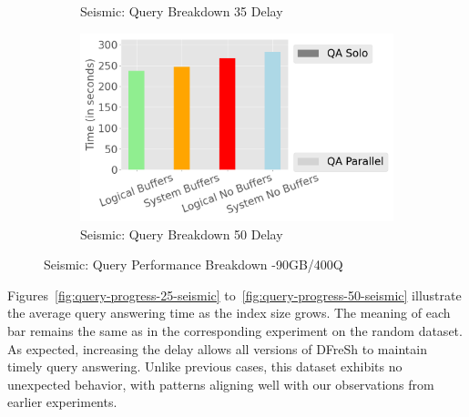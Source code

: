 \begin{figure}
\begin{subfigure}[c]{0.48\textwidth}
		\caption{Seismic: Query Breakdown 35 Delay}
		\label{fig:actual-query-breakdown-35-seismic}
	\end{subfigure}
	\begin{subfigure}[c]{0.48\textwidth}
		\includegraphics[width=1\textwidth]	 {figures/Experiments/Dynamic/SEISMIC/50/breakdown_seismic_50.png}
		\caption{Seismic: Query Breakdown 50 Delay}
		\label{fig:actual-query-breakdown-50-seismic}
	\end{subfigure}
	\caption{Seismic: Query Performance Breakdown -90GB/400Q}
	\label{fig:dfresh-query-breakdown-seismic}
\end{figure}

%
Figures~\ref{fig:query-progress-25-seismic} to~\ref{fig:query-progress-50-seismic} 
illustrate the average query answering time as the index size grows. The meaning of
each bar remains the same as in the corresponding experiment on the random dataset.
As expected, increasing the delay allows all versions of DFreSh to maintain timely
query answering. Unlike previous cases, this dataset exhibits no unexpected behavior,
with patterns aligning well with our observations from earlier experiments.

